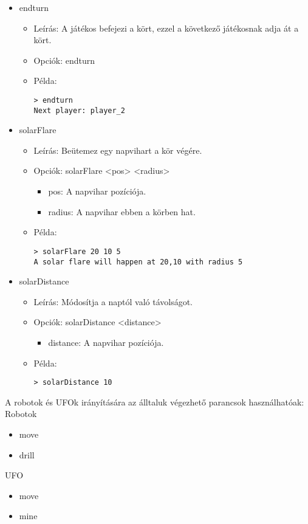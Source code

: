 \documentclass[../../projlab]{subfiles}
\begin{document}
\begin{itemize}
    \item endturn
    \begin{itemize}
        \item Leírás: A játékos befejezi a kört, ezzel a következő játékosnak adja át a kört.
        \item Opciók: endturn
        \item Példa:
            \begin{verbatim}
> endturn
Next player: player_2 
            \end{verbatim}
    \end{itemize}

    \item solarFlare
    \begin{itemize}
        \item Leírás: Beütemez egy napvihart a kör végére.
        \item Opciók: solarFlare <pos> <radius>
            \begin{itemize}
                \item pos: A napvihar pozíciója.
                \item radius: A napvihar ebben a körben hat.
            \end{itemize}
        \item Példa:
            \begin{verbatim}
> solarFlare 20 10 5
A solar flare will happen at 20,10 with radius 5
            \end{verbatim}
    \end{itemize}

    \item solarDistance
    \begin{itemize}
        \item Leírás: Módosítja a naptól való távolságot.
        \item Opciók: solarDistance <distance>
            \begin{itemize}
                \item distance: A napvihar pozíciója.
            \end{itemize}
        \item Példa:
            \begin{verbatim}
> solarDistance 10
            \end{verbatim}
    \end{itemize}

\end{itemize}

A robotok és UFOk irányítására az álltaluk végezhető parancsok használhatóak: \newline
Robotok
\begin{itemize}
    \item move
    \item drill
\end{itemize}
UFO
\begin{itemize}
    \item move
    \item mine
\end{itemize}
\end{document}
